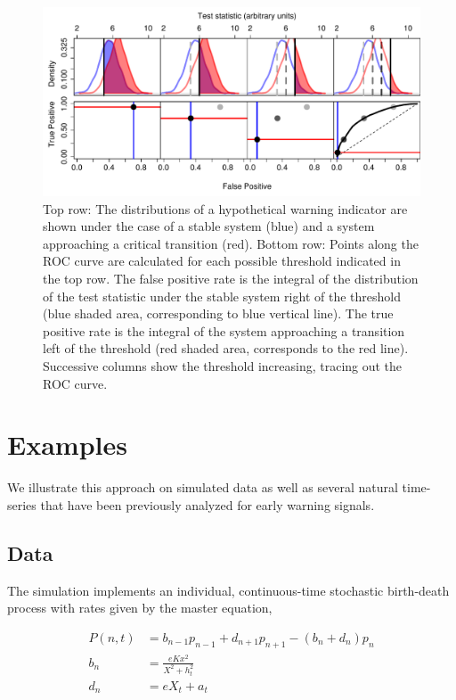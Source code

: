 \documentclass[authoryear,review,11pt]{elsarticle}
\begin{document}
\begin{figure}
   \begin{center}
     \includegraphics[width=\linewidth]{Fig1}
     \caption{Top row: The distributions of a hypothetical warning indicator are shown under the case of a stable system (blue) and a system approaching a critical transition (red).  Bottom row: Points along the ROC curve are calculated for each possible threshold indicated in the top row.  The false positive rate is the integral of the distribution of the test statistic under the stable system right of the threshold (blue shaded area, corresponding to blue vertical line).  The true positive rate is the integral of the system approaching a transition left of the threshold (red shaded area, corresponds to the red line).  Successive columns show the threshold increasing, tracing out the ROC curve.}
     \label{fig:roc_intro}
  \end{center}
 \end{figure}





\section{Examples}
We illustrate this approach on simulated data as well as several natural time-series that have been previously analyzed for early warning signals.  

\subsection*{Data}
The simulation implements an individual, continuous-time stochastic birth-death process with rates given by the master equation,

\begin{align}
    P(n,t) &= b_{n-1} p_{n-1} + d_{n+1}p_{n+1} - (b_n+d_n)p_n  \label{master} \\ 
    b_n &= \frac{e K x^2}{X^2 + h_t^2} \\ 
    d_n &= e X_t + a_t   
\end{align}
\end{document}
